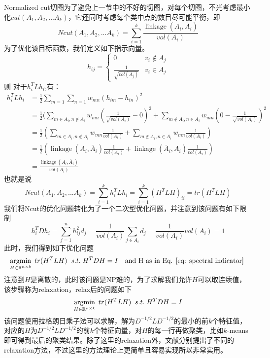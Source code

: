 Normalized cut切图为了避免上一节中的不好的切图，对每个切图，不光考虑最小化$cut(A_1,A_2,...A_k)$，它还同时考虑每个类中点的数目尽可能平衡，即
\begin{equation*}
Ncut(A_1,A_2,...A_k) = \sum\limits_{i=1}^{k}\frac{\operatorname{linkage}(A_i, \overline{A}_i )}{vol(A_i)}
\end{equation*}
为了优化该目标函数，我们定义如下指示向量。
\begin{equation}
\label{eq: spectral indicator}
h_{ij}= \begin{cases} 0& { v_i \notin A_j}\\ \frac{1}{\sqrt{vol(A_j)}}& { v_i \in A_j} \end{cases}
\end{equation}
则
对于$h_i^TLh_i$,有：
\begin{align} h_i^TLh_i & = \frac{1}{2}\sum\limits_{m=1}\sum\limits_{n=1}w_{mn}(h_{im}-h_{in})^2 \\& =\frac{1}{2}(\sum\limits_{m \in A_i, n \notin A_i}w_{mn}(\frac{1}{\sqrt{vol(A_i)}} - 0)^2 +  \sum\limits_{m \notin A_i, n \in A_i}w_{mn}(0 - \frac{1}{\sqrt{vol(A_i)}} )^2\\& = \frac{1}{2}(\sum\limits_{m \in A_i, n \notin A_i}w_{mn}\frac{1}{vol(A_i)} +  \sum\limits_{m \notin A_i, n \in A_i}w_{mn}\frac{1}{vol(A_i)})\\& = \frac{1}{2}(\operatorname{linkage}(A_i, \overline{A}_i) \frac{1}{vol(A_i)} + \operatorname{linkage}(\overline{A}_i, A_i) \frac{1}{vol(A_i)}) \\& =  \frac{\operatorname{linkage}(A_i, \overline{A}_i)}{vol(A_i)} 
\end{align}
也就是说
\begin{equation*}
Ncut(A_1,A_2,...A_k) = \sum\limits_{i=1}^{k}h_i^TLh_i = \sum\limits_{i=1}^{k}(H^TLH)_{ii} = tr(H^TLH)
\end{equation*}
我们将Ncut的优化问题转化为了一个二次型优化问题，并注意到该问题有如下限制
\begin{equation*}
h_i^TDh_i = \sum\limits_{j=1}^{n}h_{ij}^2d_j =\frac{1}{vol(A_i)}\sum\limits_{j \in A_i}d_j= \frac{1}{vol(A_i)}vol(A_i) =1
\end{equation*}
此时，我们得到如下优化问题
\begin{equation}
\label{eq: ori_spectral_clustering}
\operatorname*{argmin}\limits_{H \in \mathbb{R}^{n \times k}} \; tr(H^TLH) \;\; s.t.\;H^TDH=I \quad \text{and H as in Eq. \ref{eq: spectral indicator} }
\end{equation}
注意到$H$是离散的，此时该问题是NP难的，为了求解我们允许$H$可以取连续值，该步骤称为relaxation，relax后的问题如下
\begin{equation*}
    \label{eq: relax_spectral_clustering}
    \operatorname*{argmin}\limits_{H \in \mathbb{R}^{n \times k}} \; tr(H^TLH) \;\; s.t.\;H^TDH=I
\end{equation*}
该问题使用拉格朗日乘子法可以求解，解为$D^{-1/2}LD^{-1/2}$的最小的前$k$个特征值，对应的$H$为$D^{-1/2}LD^{-1/2}$的前$k$个特征向量，对$H$的每一行再做聚类，比如$k$-means即可得到最后的聚类结果。除了这里的relaxation外，文献\cite{bie2006fast,bresson2013multiclass,rangapuram2014tight,rangapuram2016graph}分别提出了不同的relaxation方法，不过这里的方法理论上更简单且容易实现所以非常实用。